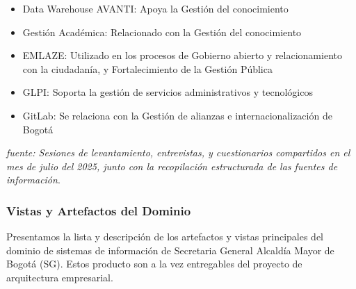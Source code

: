 \documentclass[
	a4paper, %
	12pt, %
]{include/CSSullivanBusinessReport}
\begin{document}
\begin{itemize}
  Fortalecimiento de la Gestión Pública
\item
  Data Warehouse AVANTI: Apoya la Gestión del conocimiento
\item
  Gestión Académica: Relacionado con la Gestión del conocimiento
\item
  EMLAZE: Utilizado en los procesos de Gobierno abierto y
  relacionamiento con la ciudadanía, y Fortalecimiento de la Gestión
  Pública
\item
  GLPI: Soporta la gestión de servicios administrativos y tecnológicos
\item
  GitLab: Se relaciona con la Gestión de alianzas e internacionalización
  de Bogotá
\end{itemize}

\emph{fuente: Sesiones de levantamiento, entrevistas, y cuestionarios
compartidos en el mes de julio del 2025, junto con la recopilación
estructurada de las fuentes de información}.

\subsubsection{Vistas y Artefactos del
Dominio}\label{sec:vistas-y-artefactos-del-dominio}

Presentamos la lista y descripción de los artefactos y vistas
principales del dominio de sistemas de información de Secretaria General
Alcaldía Mayor de Bogotá (SG). Estos producto son a la vez entregables
del proyecto de arquitectura empresarial.
\end{document}
